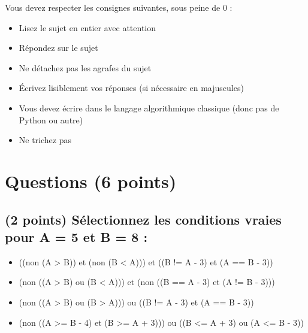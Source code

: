 \documentclass[11pt,a4paper]{article}
\begin{document}
\MakeExamTitle                   %


\bigskip

Vous devez respecter les consignes suivantes, sous peine de 0 :

\begin{itemize}
\item Lisez le sujet en entier avec attention
\item Répondez sur le sujet
\item Ne détachez pas les agrafes du sujet
\item \'Ecrivez lisiblement vos réponses (si nécessaire en majuscules)
\item Vous devez écrire dans le langage algorithmique classique (donc pas de Python ou autre)
\item Ne trichez pas
\end{itemize}



\section{Questions (6 points)}

\subsection{(2 points) Sélectionnez les conditions vraies pour A = 5 et B = 8 : }

\bigskip

\begin{itemize}
  \item[\CaseCoche] ((non (A > B)) et (non (B < A))) et ((B != A - 3) et (A == B - 3)) \\ %
  \item[\CaseCoche] (non ((A > B) ou (B < A))) et (non ((B == A - 3) et (A != B - 3))) \\ %
  \item[\CaseCoche] (non ((A > B) ou (B > A))) ou ((B != A - 3) et (A == B - 3)) \\ %
  \item[\CaseCoche] (non ((A >= B - 4) et (B >= A + 3))) ou ((B <= A + 3) ou (A <= B - 3)) \\ %
\end{itemize}
\end{document}
